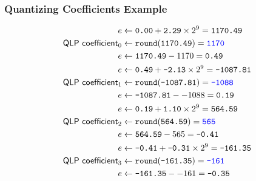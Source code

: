 \subsubsection{Quantizing Coefficients Example}
\begin{align*}
e &\leftarrow \texttt{0.00} + \texttt{2.29} \times 2 ^ 9 = \texttt{1170.49} \\
\textsf{QLP coefficient}_0 &\leftarrow \texttt{round}(\texttt{1170.49}) = \texttt{\color{blue}1170} \\
e &\leftarrow \texttt{1170.49} - 1170 = \texttt{0.49} \\
e &\leftarrow \texttt{0.49} + \texttt{-2.13} \times 2 ^ 9 = \texttt{-1087.81} \\
\textsf{QLP coefficient}_1 &\leftarrow \texttt{round}(\texttt{-1087.81}) = \texttt{\color{blue}-1088} \\
e &\leftarrow \texttt{-1087.81} - -1088 = \texttt{0.19} \\
e &\leftarrow \texttt{0.19} + \texttt{1.10} \times 2 ^ 9 = \texttt{564.59} \\
\textsf{QLP coefficient}_2 &\leftarrow\texttt{round}(\texttt{564.59}) = \texttt{\color{blue}565} \\
e &\leftarrow \texttt{564.59} - 565 = \texttt{-0.41} \\
e &\leftarrow \texttt{-0.41} + \texttt{-0.31} \times 2 ^ 9 = \texttt{-161.35} \\
\textsf{QLP coefficient}_3 &\leftarrow \texttt{round}(\texttt{-161.35}) = \texttt{\color{blue}-161} \\
e &\leftarrow \texttt{-161.35} - -161 = \texttt{-0.35} \\
\end{align*}
